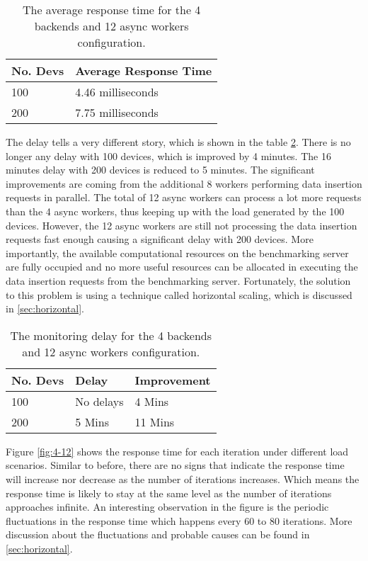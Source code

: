 \documentclass[../thesis.tex]{subfiles}
\begin{document}
\begin{table}[h!]
\begin{center}
\caption{The average response time for the 4 backends and 12 async workers configuration.}
\label{tab:avg4-12}
\begin{tabular}{l|l}
\toprule
\textbf{No. Devs} & \textbf{Average Response Time}\\
\midrule
100 & 4.46 milliseconds\\
200 & 7.75 milliseconds\\
\bottomrule
\end{tabular}
\end{center}
\end{table}

The delay tells a very different story, which is shown in the table \ref{tab:delay4-12}. There is no longer any delay with 100 devices, which is improved by 4 minutes. The 16 minutes delay with 200 devices is reduced to 5 minutes. The significant improvements are coming from the additional 8 workers performing data insertion requests in parallel. The total of 12 async workers can process a lot more requests than the 4 async workers, thus keeping up with the load generated by the 100 devices. However, the 12 async workers are still not processing the data insertion requests fast enough causing a significant delay with 200 devices. More importantly, the available computational resources on the benchmarking server are fully occupied and no more useful resources can be allocated in executing the data insertion requests from the benchmarking server. Fortunately, the solution to this problem is using a technique called horizontal scaling, which is discussed in \autoref{sec:horizontal}.

\begin{table}[h!]
\begin{center}
\caption{The monitoring delay for the 4 backends and 12 async workers configuration.}
\label{tab:delay4-12}
\begin{tabular}{l|l|l}
\toprule
\textbf{No. Devs} & \textbf{Delay} & \textbf{Improvement}\\
\midrule
100 & No delays & 4 Mins	\\
200 & 5 Mins & 11 Mins\\
\bottomrule
\end{tabular}
\end{center}
\end{table}

Figure \ref{fig:4-12} shows the response time for each iteration under different load scenarios. Similar to before, there are no signs that indicate the response time will increase nor decrease as the number of iterations increases. Which means the response time is likely to stay at the same level as the number of iterations approaches infinite. An interesting observation in the figure is the periodic fluctuations in the response time which happens every 60 to 80 iterations. More discussion about the fluctuations and probable causes can be found in \autoref{sec:horizontal}.
\end{document}
